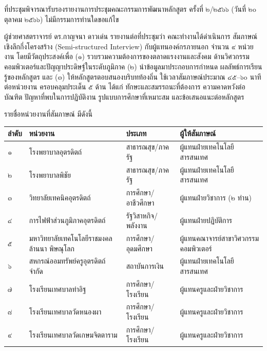 \documentclass{meetingminutes}
\begin{document}
ที่ประชุมพิจารณารับรองรายงานการประชุมคณะกรรมการพัฒนาหลักสูตร ครั้งที่ ๒/๒๕๖๖
(วันที่ ๒๐ ตุลาคม ๒๕๖๖) ไม่มีกรรมการท่านใดขอแก้ไข



ผู้ช่วยศาสตราจารย์ ดร.กาญจนา ดาวเด่น รายงานต่อที่ประชุมว่า คณะทำงานได้ดำเนินการ
สัมภาษณ์เชิงลึกกึ่งโครงสร้าง (Semi-structured Interview) กับผู้แทนองค์กรภายนอก
จำนวน ๙ หน่วยงาน โดยมีวัตถุประสงค์เพื่อ (๑) รวบรวมความต้องการของตลาดแรงงานและสังคม
ด้านวิศวกรรมคอมพิวเตอร์และปัญญาประดิษฐ์ในระดับภูมิภาค (๒) นำข้อมูลมาประกอบการกำหนด
ผลลัพธ์การเรียนรู้ของหลักสูตร และ (๓) ให้หลักสูตรตอบสนองบริบทท้องถิ่น
ใช้เวลาสัมภาษณ์ประมาณ ๔๕–๖๐ นาทีต่อหน่วยงาน ครอบคลุมประเด็น ๕ ด้าน ได้แก่
ทักษะและสมรรถนะที่ต้องการ ความคาดหวังต่อบัณฑิต ปัญหาที่พบในการปฏิบัติงาน
รูปแบบการศึกษาที่เหมาะสม และข้อเสนอแนะต่อหลักสูตร

\noindent รายชื่อหน่วยงานที่สัมภาษณ์ มีดังนี้

\vspace{6pt}
\noindent\small
\begin{tabular}{|>{\centering\arraybackslash}p{0.8cm}|p{5.5cm}|p{3.2cm}|p{4.0cm}|}
\hline
\bfseries ลำดับ & \bfseries หน่วยงาน & \bfseries ประเภท & \bfseries ผู้ให้สัมภาษณ์ \\
\hline
๑ & โรงพยาบาลอุตรดิตถ์ & สาธารณสุข/ภาครัฐ & ผู้แทนฝ่ายเทคโนโลยีสารสนเทศ \\
\hline
๒ & โรงพยาบาลพิชัย & สาธารณสุข/ภาครัฐ & ผู้แทนฝ่ายเทคโนโลยีสารสนเทศ \\
\hline
๓ & วิทยาลัยเทคนิคอุตรดิตถ์ & การศึกษา/อาชีวศึกษา & ผู้แทนฝ่ายวิชาการ (๒ ท่าน) \\
\hline
๔ & การไฟฟ้าส่วนภูมิภาคอุตรดิตถ์ & รัฐวิสาหกิจ/พลังงาน & ผู้แทนฝ่ายปฏิบัติการ \\
\hline
๕ & มหาวิทยาลัยเทคโนโลยีราชมงคลล้านนา พิษณุโลก & การศึกษา/อุดมศึกษา & ผู้แทนคณาจารย์สาขาวิศวกรรมคอมพิวเตอร์ \\
\hline
๖ & สหกรณ์ออมทรัพย์ครูอุตรดิตถ์ จำกัด & สถาบันการเงิน & ผู้แทนฝ่ายเทคโนโลยีสารสนเทศ \\
\hline
๗ & โรงเรียนเทศบาลท่าอิฐ & การศึกษา/โรงเรียน & ผู้แทนครูและฝ่ายวิชาการ \\
\hline
๘ & โรงเรียนเทศบาลวัดหนองผา & การศึกษา/โรงเรียน & ผู้แทนครูและฝ่ายวิชาการ \\
\hline
๙ & โรงเรียนเทศบาลวัดเกษมจิตตาราม & การศึกษา/โรงเรียน & ผู้แทนครูและฝ่ายวิชาการ \\
\hline
\end{tabular}
\normalsize
\end{document}
